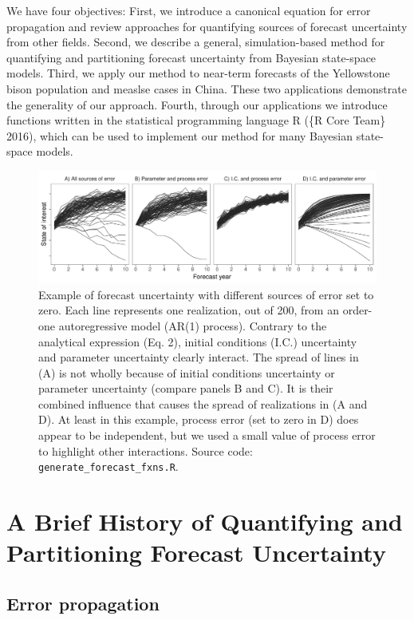 \documentclass[12pt,]{article}
\begin{document}
We have four objectives: First, we introduce a canonical equation for
error propagation and review approaches for quantifying sources of
forecast uncertainty from other fields. Second, we describe a general,
simulation-based method for quantifying and partitioning forecast
uncertainty from Bayesian state-space models. Third, we apply our method
to near-term forecasts of the Yellowstone bison population and measlse
cases in China. These two applications demonstrate the generality of our
approach. Fourth, through our applications we introduce functions
written in the statistical programming language R (\{R Core Team\}
2016), which can be used to implement our method for many Bayesian
state-space models.

\begin{figure}
\centering
\includegraphics{../figures/forecast_uncertainty_example.pdf}
\caption{Example of forecast uncertainty with different sources of error
set to zero. Each line represents one realization, out of 200, from an
order-one autoregressive model (AR(1) process). Contrary to the
analytical expression (Eq. 2), initial conditions (I.C.) uncertainty and
parameter uncertainty clearly interact. The spread of lines in (A) is
not wholly because of initial conditions uncertainty or parameter
uncertainty (compare panels B and C). It is their combined influence
that causes the spread of realizations in (A and D). At least in this
example, process error (set to zero in D) does appear to be independent,
but we used a small value of process error to highlight other
interactions. Source code: \texttt{generate\_forecast\_fxns.R}.}
\end{figure}

\section{A Brief History of Quantifying and Partitioning Forecast
Uncertainty}\label{a-brief-history-of-quantifying-and-partitioning-forecast-uncertainty}

\subsection{Error propagation}\label{error-propagation}
\end{document}
